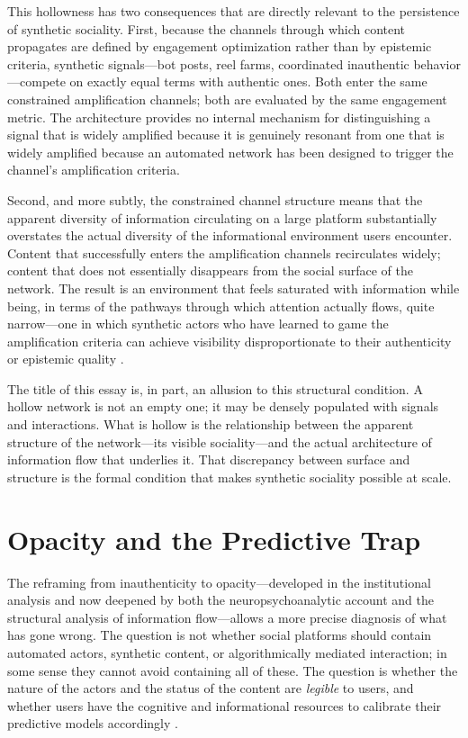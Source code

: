\documentclass[12pt,a4paper]{article}
\begin{document}
This hollowness has two consequences that are directly relevant to the persistence of synthetic
sociality. First, because the channels through which content propagates are defined by engagement
optimization rather than by epistemic criteria, synthetic signals---bot posts, reel farms,
coordinated inauthentic behavior---compete on exactly equal terms with authentic ones. Both enter
the same constrained amplification channels; both are evaluated by the same engagement metric.
The architecture provides no internal mechanism for distinguishing a signal that is widely
amplified because it is genuinely resonant from one that is widely amplified because an automated
network has been designed to trigger the channel's amplification criteria.

Second, and more subtly, the constrained channel structure means that the apparent diversity of
information circulating on a large platform substantially overstates the actual diversity of the
informational environment users encounter. Content that successfully enters the amplification
channels recirculates widely; content that does not essentially disappears from the social
surface of the network. The result is an environment that feels saturated with information while
being, in terms of the pathways through which attention actually flows, quite narrow---one in
which synthetic actors who have learned to game the amplification criteria can achieve visibility
disproportionate to their authenticity or epistemic quality \citep{vosoughi2018,tufekci2015}.

The title of this essay is, in part, an allusion to this structural condition. A hollow network
is not an empty one; it may be densely populated with signals and interactions. What is hollow
is the relationship between the apparent structure of the network---its visible sociality---and
the actual architecture of information flow that underlies it. That discrepancy between surface
and structure is the formal condition that makes synthetic sociality possible at scale.

\section{Opacity and the Predictive Trap}

The reframing from inauthenticity to opacity---developed in the institutional analysis and now
deepened by both the neuropsychoanalytic account and the structural analysis of information
flow---allows a more precise diagnosis of what has gone wrong. The question is not whether
social platforms should contain automated actors, synthetic content, or algorithmically mediated
interaction; in some sense they cannot avoid containing all of these. The question is whether
the nature of the actors and the status of the content are \emph{legible} to users, and whether
users have the cognitive and informational resources to calibrate their predictive models
accordingly \citep{gillespie2018}.
\end{document}
